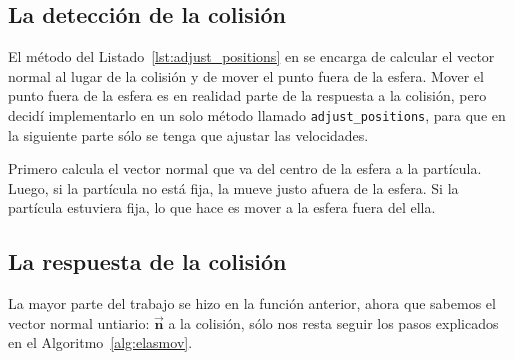 \subsection{La detección de la colisión}
El método del Listado~\ref{lst:adjust_positions} en se encarga de calcular el vector normal al lugar de la colisión y de mover el punto fuera de la esfera.
Mover el punto fuera de la esfera es en realidad parte de la respuesta a la colisión, pero decidí implementarlo en un solo método llamado \texttt{adjust_positions}, para que en la siguiente parte sólo se tenga que ajustar las velocidades.


Primero calcula el vector normal que va del centro de la esfera a la partícula.
Luego, si la partícula no está fija, la mueve justo afuera de la esfera.
Si la partícula estuviera fija, lo que hace es mover a la esfera fuera del ella.

\subsection{La respuesta de la colisión}
La mayor parte del trabajo se hizo en la función anterior, ahora que sabemos el vector normal untiario: $\vec{\textbf{n}}$ a la colisión, sólo nos resta seguir los pasos explicados en el Algoritmo~\ref{alg:elasmov}.

